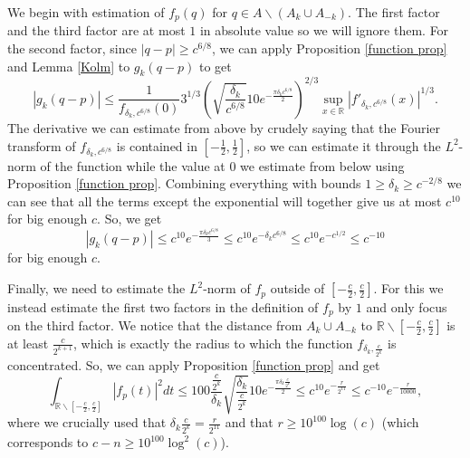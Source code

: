 \documentclass[12pt]{amsart}
\numberwithin{equation}{section}
\newcommand{\R}{\mathbb{R}}
\begin{document}
We begin with estimation of $f_p(q)$ for $q\in A\backslash (A_k\cup A_{-k})$. The first factor and the third factor are at most $1$ in absolute value so we will ignore them. For the second factor, since $|q-p|\ge c^{6/8}$, we can apply Proposition \ref{function prop} and Lemma \ref{Kolm} to $g_k(q-p)$ to get
$$|g_k(q-p)| \le \frac{1}{f_{\delta_k, c^{6/8}}(0)}3^{1/3}\left(\sqrt{\frac{\delta_k}{c^{6/8}}}10e^{-\frac{\pi \delta_k c^{6/8}}{2}}\right)^{2/3}\sup_{x\in \R}|f'_{\delta_k, c^{6/8}}(x)|^{1/3}.$$
The derivative we can estimate from above by crudely saying that the Fourier transform of $f_{\delta_k, c^{6/8}}$ is contained in $[-\frac{1}{2},\frac{1}{2}]$, so we can estimate it through the $L^2$-norm of the function while the value at $0$ we estimate from below using Proposition \ref{function prop}. Combining everything with bounds $1 \ge \delta_k \ge c^{-2/8}$ we can see that all the terms except the exponential will together give us at most $c^{10}$ for big enough $c$. So, we get
$$|g_k(q-p)|\le c^{10} e^{-\frac{\pi \delta_k c^{6/8}}{3} }\le c^{10}e^{-\delta_kc^{6/8}} \le c^{10}e^{-c^{1/2}} \le c^{-10}$$
for big enough $c$.

Finally, we need to estimate the $L^2$-norm of $f_p$ outside of $[-\frac{c}{2},\frac{c}{2}]$. For this we instead estimate the first two factors in the definition of $f_p$ by $1$ and only focus on the third factor. We notice that the distance from $A_k\cup A_{-k}$ to $\R\backslash [-\frac{c}{2},\frac{c}{2}]$ is at least $\frac{c}{2^{k+1}}$, which is exactly the radius to which the function $f_{\delta_k, \frac{c}{2^k}}$ is concentrated. So, we can apply Proposition \ref{function prop} and get
$$\int_{\R\backslash [-\frac{c}{2},\frac{c}{2}]} |f_p(t)|^2dt \le 100 \frac{\frac{c}{2^k}}{\delta_k} \sqrt{\frac{\delta_k}{\frac{c}{2^k}}} 10 e^{-\frac{\pi \delta_k\frac{c}{2^k}}{2}}\le c^{10}e^{-\frac{r}{2^{11}}}\le c^{-10}e^{-\frac{r}{10000}},$$
where we crucially used that $\delta_k\frac{c}{2^k} = \frac{r}{2^{11}}$ and that $r\ge 10^{100}\log(c)$ (which corresponds to $c-n\ge 10^{100}\log^2(c)$).
\end{document}
